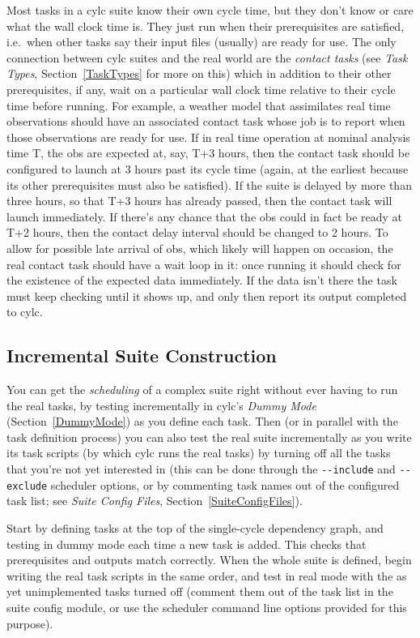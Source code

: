 \documentclass[11pt,a4paper]{article}
\begin{document}
Most tasks in a cylc suite know their own cycle time, but they don't
know or care what the wall clock time is.  They just run when their
prerequisites are satisfied, i.e.\  when other tasks say their input
files (usually) are ready for use. The only connection between cylc
suites and the real world are the {\em contact tasks} (see {\em Task
Types}, Section~\ref{TaskTypes} for more on this) which in addition to
their other prerequisites, if any, wait on a particular wall clock time
relative to their cycle time before running.  For example, a weather
model that assimilates real time observations should have an associated
contact task whose job is to report when those observations are ready
for use.  If in real time operation at nominal analysis time T, the obs
are expected at, say, T+3 hours, then the contact task should be
configured to launch at 3 hours past its cycle time (again, at the
earliest because its other prerequisites must also be satisfied).
If the suite is delayed by more than three hours, so that T+3 hours 
has already passed, then the contact task will launch immediately.
If there's any chance that the obs could in fact be ready at T+2 hours,
then the contact delay interval should be changed to 2 hours.  To allow
for possible late arrival of obs, which likely will happen on occasion,
the real contact task should have a wait loop in it: once running it
should check for the existence of the expected data immediately. If the
data isn't there the task must keep checking until it shows up, and only then
report its output completed to cylc. 


\subsection{Incremental Suite Construction} 
\label{IncrementalSuiteConstruction}

You can get the {\em scheduling} of a complex suite right without ever
having to run the real tasks, by testing incrementally in cylc's {\em
Dummy Mode} (Section~\ref{DummyMode}) as you define each task. Then (or
in parallel with the task definition process) you can also test the real
suite incrementally as you write its task scripts (by which cylc runs
the real tasks) by turning off all the tasks that you're not yet
interested in (this can be done through the \lstinline=--include= and
\lstinline=--exclude= scheduler options, or by commenting task names out
of the configured task list; see {\em Suite Config Files},
Section~\ref{SuiteConfigFiles}).

Start by defining tasks at the top of the single-cycle dependency graph,
and testing in dummy mode each time a new task is added. This checks
that prerequisites and outputs match correctly. When the whole suite is
defined, begin writing the real task scripts in the same order, and test
in real mode with the as yet unimplemented tasks turned off (comment
them out of the task list in the suite config module, or use the
scheduler command line options provided for this purpose). 
\end{document}
